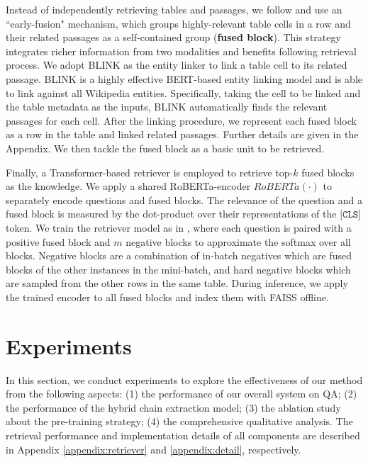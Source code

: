 \documentclass[11pt]{article}
\begin{document}
	Instead of independently retrieving tables and passages, we follow \citet{chen2020open} and use an ``early-fusion" mechanism, 
which groups highly-relevant table cells in a row and their related passages as a self-contained group (\textbf{fused block}). This strategy integrates richer information from two modalities and benefits following retrieval process. 
	We adopt BLINK \cite{wu2019zero} as the entity linker to link a table cell to its related passage. 
	BLINK is a highly effective BERT-based entity linking model and is able to link against all Wikipedia entities. 
	Specifically, taking the cell to be linked and the table metadata as the inputs, BLINK automatically finds the relevant passages for each cell.
	After the linking procedure, we represent each fused block as a row in the table and linked related passages. Further details are given in the Appendix. 
	We then tackle the fused block as a basic unit to be retrieved. 
	
Finally, a Transformer-based retriever is employed to retrieve top-$k$ fused blocks as the knowledge. We apply a shared RoBERTa-encoder $RoBERTa( \cdot )$ \cite{Liu2019RoBERTaAR} to separately encode questions and fused blocks. 
	The relevance of the question and a fused block is measured by the dot-product over their representations of the $\texttt{[CLS]}$ token.
We train the retriever model as in \citet{karpukhin2020dense}, where each question is paired 
	with a positive fused block and $m$ negative blocks to approximate the softmax over all blocks. 
	Negative blocks are a combination of in-batch negatives which are fused blocks of the other instances in the mini-batch, 
	and hard negative blocks which are sampled from the other rows in the same table.
During inference, we apply the trained encoder to all fused blocks and index them with FAISS \cite{Johnson2021Faiss} offline. 
	
	\section{Experiments}
	In this section, we conduct experiments to explore the effectiveness of our method from the following aspects: 
	(1) the performance of our overall system on QA;
	(2) the performance of the hybrid chain extraction model; 
	(3) the ablation study about the pre-training strategy;
	(4) the comprehensive qualitative analysis.
	The retrieval performance and implementation details of all components are described in Appendix \ref{appendix:retriever} and \ref{appendix:detail}, respectively.
\end{document}
